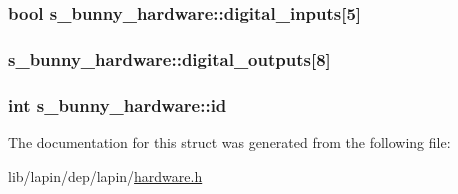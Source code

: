 \hypertarget{structs__bunny__hardware_a7967f0f90cb718e96c5ed76ce6666fb5}{
\subsubsection[{digital\-\_\-inputs}]{ {\bf bool} s\-\_\-bunny\-\_\-hardware\-::digital\-\_\-inputs\mbox{[}5\mbox{]}}}\label{structs__bunny__hardware_a7967f0f90cb718e96c5ed76ce6666fb5}
\hypertarget{structs__bunny__hardware_af94bf845a369eaba768f4658c2441103}{
\subsubsection[{digital\-\_\-outputs}]{ s\-\_\-bunny\-\_\-hardware\-::digital\-\_\-outputs\mbox{[}8\mbox{]}}}\label{structs__bunny__hardware_af94bf845a369eaba768f4658c2441103}
\hypertarget{structs__bunny__hardware_ac432cb9537587d721684ef22d95e2a8d}{
\subsubsection[{id}]{ {\bf int} s\-\_\-bunny\-\_\-hardware\-::id}}\label{structs__bunny__hardware_ac432cb9537587d721684ef22d95e2a8d}


The documentation for this struct was generated from the following file\-:\begin{DoxyCompactItemize}
\item 
lib/lapin/dep/lapin/\hyperlink{hardware_8h}{hardware.\-h}\end{DoxyCompactItemize}
